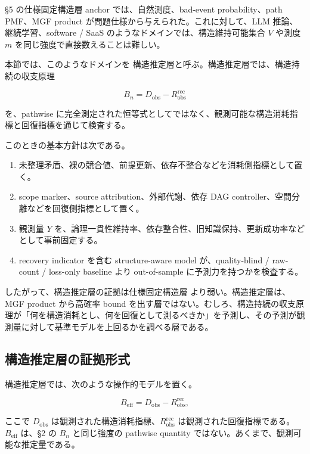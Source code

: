 \documentclass[12pt,a4paper]{article}
\begin{document}
§5 の仕様固定構造層 anchor では、自然測度、bad-event probability、path PMF、MGF product が問題仕様から与えられた。これに対して、LLM 推論、継続学習、software / SaaS のようなドメインでは、構造維持可能集合 \(V\) や測度 \(m\) を同じ強度で直接数えることは難しい。

本節では、このようなドメインを 構造推定層と呼ぶ。構造推定層では、構造持続の収支原理

\[
B_{n}=D_{\mathrm{obs}}-R_{\mathrm{obs}}^{\mathrm{rec}}
\]

を、pathwise に完全測定された恒等式としてではなく、観測可能な構造消耗指標と回復指標を通じて検査する。

このときの基本方針は次である。

\begin{enumerate}
\def\labelenumi{\arabic{enumi}.}
\tightlist
\item
  未整理矛盾、裸の競合値、前提更新、依存不整合などを消耗側指標として置く。
\item
  scope marker、source attribution、外部代謝、依存 DAG controller、空間分離などを回復側指標として置く。
\item
  観測量 \(Y\) を、論理一貫性維持率、依存整合性、旧知識保持、更新成功率などとして事前固定する。
\item
  recovery indicator を含む structure-aware model が、quality-blind / raw-count / loss-only baseline より out-of-sample に予測力を持つかを検査する。
\end{enumerate}

したがって、構造推定層の証拠は仕様固定構造層 より弱い。構造推定層は、MGF product から高確率 bound を出す層ではない。むしろ、構造持続の収支原理が「何を構造消耗とし、何を回復として測るべきか」を予測し、その予測が観測量に対して基準モデルを上回るかを調べる層である。

\subsection{構造推定層の証拠形式}\label{ux69cbux9020ux63a8ux5b9aux5c64ux306eux8a3cux62e0ux5f62ux5f0f}

構造推定層では、次のような操作的モデルを置く。

\[
B_{\mathrm{eff}} = D_{\mathrm{obs}} - R_{\mathrm{obs}}^{\mathrm{rec}},
\]

ここで \(D_{\mathrm{obs}}\) は観測された構造消耗指標、\(R_{\mathrm{obs}}^{\mathrm{rec}}\) は観測された回復指標である。\(B_{\mathrm{eff}}\) は、§2 の \(B_{n}\) と同じ強度の pathwise quantity ではない。あくまで、観測可能な推定量である。
\end{document}
